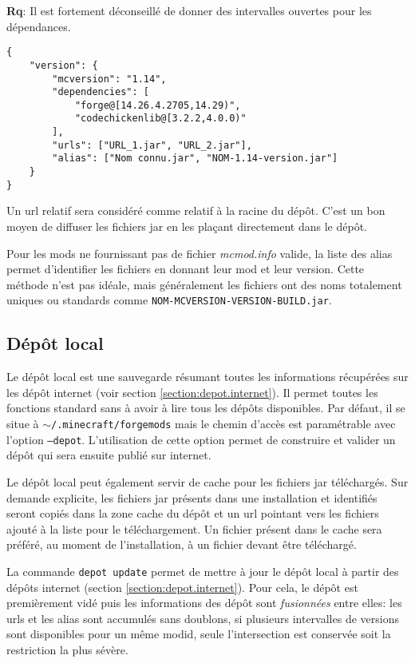\documentclass{article}
\newcommand{\remarque}[0]{\par\noindent\textbf{Rq}: }
\begin{document}
\remarque Il est fortement déconseillé de donner des intervalles ouvertes pour les dépendances.

\begin{verbatim}
{
    "version": {
        "mcversion": "1.14",
        "dependencies": [
            "forge@[14.26.4.2705,14.29)",
            "codechickenlib@[3.2.2,4.0.0)"
        ],
        "urls": ["URL_1.jar", "URL_2.jar"],
        "alias": ["Nom connu.jar", "NOM-1.14-version.jar"]
    }
}
\end{verbatim}

Un url relatif sera considéré comme relatif à la racine du dépôt.
C'est un bon moyen de diffuser les fichiers jar en les plaçant directement dans le dépôt.

Pour les mods ne fournissant pas de fichier \textit{mcmod.info} valide, la liste des alias permet d'identifier les fichiers en donnant leur mod et leur version.
Cette méthode n'est pas idéale, mais généralement les fichiers ont des noms totalement uniques ou standards comme \verb|NOM-MCVERSION-VERSION-BUILD.jar|.

\subsection{Dépôt local}
\label{section:depot.local}
Le dépôt local est une sauvegarde résumant toutes les informations récupérées sur les dépôt internet (voir section \ref{section:depot.internet}).
Il permet toutes les fonctions standard sans à avoir à lire tous les dépôts disponibles.
Par défaut, il se situe à \texttt{$\sim$/.minecraft/forgemods} mais le chemin d'accès est paramétrable avec l'option \texttt{--depot}.
L'utilisation de cette option permet de construire et valider un dépôt qui sera ensuite publié sur internet.

Le dépôt local peut également servir de cache pour les fichiers jar téléchargés.
Sur demande explicite, les fichiers jar présents dans une installation et identifiés seront copiés dans la zone cache du dépôt et un url pointant vers les fichiers ajouté à la liste pour le téléchargement.
Un fichier présent dans le cache sera préféré, au moment de l'installation, à un fichier devant être téléchargé.

La commande \texttt{depot update} permet de mettre à jour le dépôt local à partir des dépôts internet (section \ref{section:depot.internet}).
Pour cela, le dépôt est premièrement vidé puis les informations des dépôt sont \textit{fusionnées} entre elles: les urls et les alias sont accumulés sans doublons, si plusieurs intervalles de versions sont disponibles pour un même modid, seule l'intersection est conservée soit la restriction la plus sévère.
\end{document}
